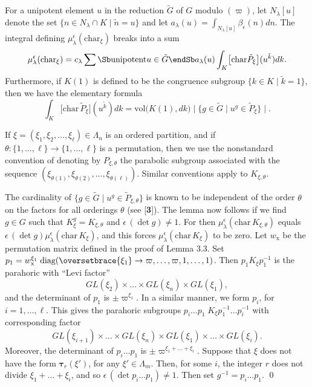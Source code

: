 For a unipotent element $u$ in the reduction $\tilde G$ of $G$ modulo $(\varpi)$,
let
  $ N_{\lambda} [u]$ denote the set  
    $\{ n \in N_{\lambda} \cap K \mid \tilde n = u \} $
and let 
  $ a_{\lambda} (u) = \int_{N_{\lambda}[u]}
    \beta_{\epsilon} (n) dn $.
The integral defining $\mu^\epsilon_\lambda(\text{char}_\xi)$ breaks
into a sum
%
$$
  \mu_{\lambda}^{\epsilon} (\text{char}_{\xi}) =
  c_{\lambda}
  \sum\Sb 
     \text{unipotent} \\
     u \in \tilde G \endSb
  a_{\lambda} (u)
  \int_K
  \bigl[
     \text{char}
     \tilde P_{\xi}
  \bigr]
  (u^{\tilde k}) dk.
$$
%
Furthermore, if $K(1)$ is defined to be the congruence subgroup
$\{k\in K\mid \tilde k=1\}$, then we have the elementary formula
%
$$
  \int_K
  \bigl[
    \text{char}\,\tilde P_\xi
  \bigr]
  ( u^{\tilde k})
  dk =
  \text{vol}
  \bigl(
    K(1), dk
  \bigr)
 \mid 
  \{
    g \in \tilde G \mid u^g \in \tilde P_{\xi}
  \}\mid.
$$

If
  $ \xi = (\xi_1, \xi_2, \dots ,\xi_{\ell} ) \in\Lambda_n$ is an
  ordered partition,
and if
  $ \theta: \{ 1, \dots , \ell \} \to
    \{ 1, \dots , \ell \} $
is a permutation, then we use the nonstandard convention of denoting by
  $ P_{\xi, \theta} $
the parabolic subgroup associated with the sequence
  $ (\xi_{\theta(1)},
     \xi_{\theta(2)}, \dots ,
     \xi_{\theta(\ell)} ) $.
Similar conventions apply to 
  $ K_{\xi,\theta} $.

The cardinality of
  $ \{ g \in \tilde G \mid u^g \in \tilde P_{\xi,\theta} \} $
is known to be independent of the order
  $ \theta $
on the factors for all orderings
  $ \theta $ (see [{\bf 3}]).
The lemma now follows if we find 
  $ g \in G $
such that
  $ K_{\xi}^g  = K_{\xi,\theta} $
and
  $ \epsilon \, (\det g) \neq 1 $.
For then 
%
$
   \mu_{\lambda}^{\epsilon} (\text{char}\,K_{\xi,\theta}) $
equals
    $ \epsilon \,(\det g) \mu_{\lambda}^{\epsilon} 
      (\text{char}\, K_{\xi})$, and this forces
    $\mu_{\lambda}^{\epsilon} (\text{char}\, K_{\xi})$ to be zero.
Let
  $ w_{\text{x}} $ be the permutation matrix defined in 
  the proof of Lemma 3.3.
Set
  $ p_1 = w_{\text{x}}^{\xi_1} \; \text{diag} 
     ( 
      \oversetbrace{\xi_1}\to {\vphantom{1}
         \varpi,\dots , \varpi,} \,1,\dots,1) $.
Then
  $ p_1 K_{\xi} p_1^{-1} $
is the parahoric with ``Levi factor''
$$
  GL(\xi_2) \times \dots \times 
  GL(\xi_n) \times
  GL(\xi_1),
$$
%
and the determinant of
  $ p_1 $ is
  $\pm\varpi^{\xi_1} $.
In a similar manner, we form
  $ p_i $,
  for $ i = 1, \dots , \ell $.
This gives the parahoric subgroups
  $ p_i \dots p_1 \;
    K_{\xi}
   p_1^{-1} \dots p_i^{-1} $
with corresponding factor
%
$$
  GL(\xi_{i+1})
  \times \dots \times
  GL(\xi_n) \times
  GL(\xi_1)
  \times \dots \times GL(\xi_i).
$$
%
Moreover, the determinant of 
  $ p_i \dots p_1 $ is
  $ \pm\varpi^{\xi_1 + \dots + \xi_i} $.
Suppose that $\xi$ does not have the form $\pmb\tau_r(\xi')$, for any $\xi'\in \Lambda_m$.
Then, for some $i$, the integer
  $ r$ does not divide $\xi_1 + \dots + \xi_i $,
and so
  $ \epsilon \, (\det p_i \dots p_1) \neq 1 $.
Then set
  $ g^{-1} = p_i \dots p_1 $.
%
\qed
\finishpproclaim

